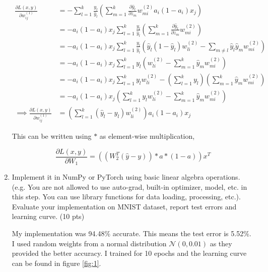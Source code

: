 \documentclass[a4paper]{article}
\theoremstyle{definition}
\newenvironment{soln}{
    \leavevmode\color{blue}\ignorespaces
}{}
\begin{document}
\begin{enumerate}
\begin{soln}
    \begin{align*}
        \frac{\partial L(x, y)}{\partial w_{ij}^{(1)}} &= - \sum\limits_{l = 1}^{k} \frac{y_l}{\hat{y}_l} \left( \sum\limits_{m = 1}^{k} \frac{\partial \hat{y}_l}{\partial z_m} w_{mi}^{(2)} a_i (1 - a_i) x_j \right) \\
        &= - a_i (1 - a_i) x_j \sum\limits_{l = 1}^{k} \frac{y_l}{\hat{y}_l} \left( \sum\limits_{m = 1}^{k} \frac{\partial \hat{y}_l}{\partial z_m} w_{mi}^{(2)} \right) \\
        &= - a_i (1 - a_i) x_j \sum\limits_{l = 1}^{k} \frac{y_l}{\hat{y}_l} \left( \hat{y}_l (1 - \hat{y}_l) w_{li}^{(2)} - \sum\limits_{m \neq l} \hat{y}_l \hat{y}_m w_{mi}^{(2)} \right) \\
        &= - a_i (1 - a_i) x_j \sum\limits_{l = 1}^{k} y_l \left( w_{li}^{(2)} - \sum\limits_{m = 1}^{k} \hat{y}_m w_{mi}^{(2)} \right) \\
        &= - a_i (1 - a_i) x_j \sum\limits_{l = 1}^{k} y_l w_{li}^{(2)} - \left( \sum\limits_{l = 1}^{k} y_l \right) \left(\sum\limits_{m = 1}^{k} \hat{y}_m w_{mi}^{(2)} \right) \\
        &= - a_i (1 - a_i) x_j \left( \sum\limits_{l = 1}^{k} y_l w_{li}^{(2)} - \sum\limits_{m = 1}^{k} \hat{y}_m w_{mi}^{(2)} \right) \\
        \implies \frac{\partial L(x, y)}{\partial w_{ij}^{(1)}} &= \left( \sum\limits_{l = 1}^{k} (\hat{y}_l - y_l) w_{li}^{(2)} \right) a_i (1 - a_i) x_j
    \end{align*}

    This can be written using $\ast$ as element-wise multiplication,

    \begin{equation*}
        \frac{\partial L(x, y)}{\partial W_1} = \left( \left( W_2^T (\hat{y} - y) \right) \ast a \ast (1 - a) \right) x^T
    \end{equation*}
    
    \end{soln}

    \pagebreak
    
    \item Implement it in NumPy or PyTorch using basic linear algebra operations. (e.g. You are not allowed to use auto-grad, built-in optimizer, model, etc. in this step. You can use library functions for data loading, processing, etc.). Evaluate your implementation on MNIST dataset, report test errors and learning curve. (10 pts)

    \begin{soln}
        My implementation was 94.48\% accurate. This means the test error is 5.52\%. I used random weights from a normal distribution $\mathcal{N}(0, 0.01)$ as they provided the better accuracy. I trained for 10 epochs and the learning curve can be found in figure \ref{fig:1}.


\end{soln}
\end{enumerate}
\end{document}
